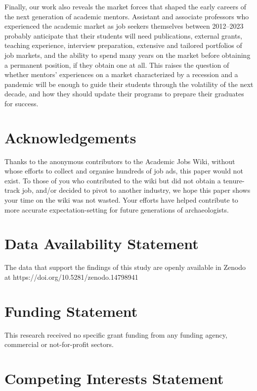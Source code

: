 \documentclass[
  12pt,
]{article}
\begin{document}
Finally, our work also reveals the market forces that shaped the early
careers of the next generation of academic mentors. Assistant and
associate professors who experienced the academic market as job seekers
themselves between 2012--2023 probably anticipate that their students
will need publications, external grants, teaching experience, interview
preparation, extensive and tailored portfolios of job markets, and the
ability to spend many years on the market before obtaining a permanent
position, if they obtain one at all. This raises the question of whether
mentors' experiences on a market characterized by a recession and a
pandemic will be enough to guide their students through the volatility
of the next decade, and how they should update their programs to prepare
their graduates for success.

\section{Acknowledgements}\label{acknowledgements}

Thanks to the anonymous contributors to the Academic Jobs Wiki, without
whose efforts to collect and organise hundreds of job ads, this paper
would not exist. To those of you who contributed to the wiki but did not
obtain a tenure-track job, and/or decided to pivot to another industry,
we hope this paper shows your time on the wiki was not wasted. Your
efforts have helped contribute to more accurate expectation-setting for
future generations of archaeologists.

\section{Data Availability Statement}\label{data-availability-statement}

The data that support the findings of this study are openly available in
Zenodo at https://doi.org/10.5281/zenodo.14798941

\section{Funding Statement}\label{funding-statement}

This research received no specific grant funding from any funding
agency, commercial or not-for-profit sectors.

\section{Competing Interests
Statement}\label{competing-interests-statement}
\end{document}
